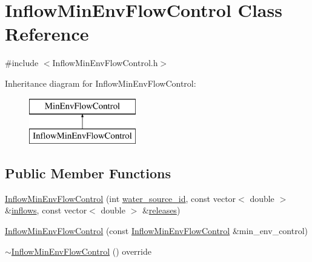 \hypertarget{classInflowMinEnvFlowControl}{}\section{Inflow\+Min\+Env\+Flow\+Control Class Reference}
\label{classInflowMinEnvFlowControl}


{\ttfamily \#include $<$Inflow\+Min\+Env\+Flow\+Control.\+h$>$}

Inheritance diagram for Inflow\+Min\+Env\+Flow\+Control\+:\begin{figure}[H]
\begin{center}
\leavevmode
\includegraphics[height=2.000000cm]{classInflowMinEnvFlowControl}
\end{center}
\end{figure}
\subsection*{Public Member Functions}
\begin{DoxyCompactItemize}
\item 
\mbox{\hyperlink{classInflowMinEnvFlowControl_aff6c04aaa6e206b29b072aea6fb38367_aff6c04aaa6e206b29b072aea6fb38367}{Inflow\+Min\+Env\+Flow\+Control}} (int \mbox{\hyperlink{classMinEnvFlowControl_aada518a047598f386daec1d0358023aa_aada518a047598f386daec1d0358023aa}{water\+\_\+source\+\_\+id}}, const vector$<$ double $>$ \&\mbox{\hyperlink{classInflowMinEnvFlowControl_a669660259afa9313c77094dec815a52f_a669660259afa9313c77094dec815a52f}{inflows}}, const vector$<$ double $>$ \&\mbox{\hyperlink{classInflowMinEnvFlowControl_a2f82b53516516be63eb169d377df1f55_a2f82b53516516be63eb169d377df1f55}{releases}})
\item 
\mbox{\hyperlink{classInflowMinEnvFlowControl_a6736e6aa07a27e314789e07a9ab30cad_a6736e6aa07a27e314789e07a9ab30cad}{Inflow\+Min\+Env\+Flow\+Control}} (const \mbox{\hyperlink{classInflowMinEnvFlowControl}{Inflow\+Min\+Env\+Flow\+Control}} \&min\+\_\+env\+\_\+control)
\item 
\mbox{\hyperlink{classInflowMinEnvFlowControl_af96a86078cd257309ed55f0cd9ed032e_af96a86078cd257309ed55f0cd9ed032e}{$\sim$\+Inflow\+Min\+Env\+Flow\+Control}} () override
\end{DoxyCompactItemize}
